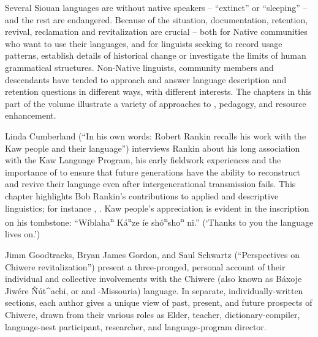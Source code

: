 \begin{refsection}

Several Siouan languages are without native speakers -- ``extinct'' or ``sleeping'' -- and the rest are endangered. Because of the situation, documentation, retention, revival, reclamation and revitalization are crucial -- both for Native communities who want to use their languages, and for linguists seeking to record usage patterns, establish details of historical change or investigate the limits of human grammatical structures. Non-Native linguists, community members and descendants have tended to approach and answer language description and retention questions in different ways, with different interests. The chapters in this part of the volume illustrate a variety of approaches to , pedagogy, and resource enhancement.

Linda Cumberland (``In his own words: Robert Rankin recalls his work with the Kaw people and their language'') interviews Rankin about his long association with the Kaw Language Program, his early fieldwork experiences and the importance of  to ensure that future generations have the ability to reconstruct and revive their language even after intergenerational transmission fails. This chapter highlights Bob Rankin's contributions to applied and descriptive linguistics; for instance \citet{CumberlandRankin2012}, \citet{Rankin1989}. Kaw people's appreciation is evident in the inscription on his tombstone: ``W\'iblaha\textsuperscript{n} K\'a\textsuperscript{n}ze \'ie sh\'o\textsuperscript{n}sho\textsuperscript{n} ni.'' (`Thanks to you the  language lives on.')

Jimm Goodtracks, Bryan James Gordon, and Saul Schwartz (``Perspectives on Chiwere revitalization'') present a three-pronged, personal account of their individual and collective involvements with the Chiwere (also known as Báxoje Jiwére \~{N}út\^{}achi, or  and -Missouria) language. In separate, individually-written sections, each author gives a unique view of past, present, and future prospects of Chiwere, drawn from their various roles as Elder, teacher, dictionary-compiler, language-nest participant, researcher, and language-program director. 


\end{refsection}
